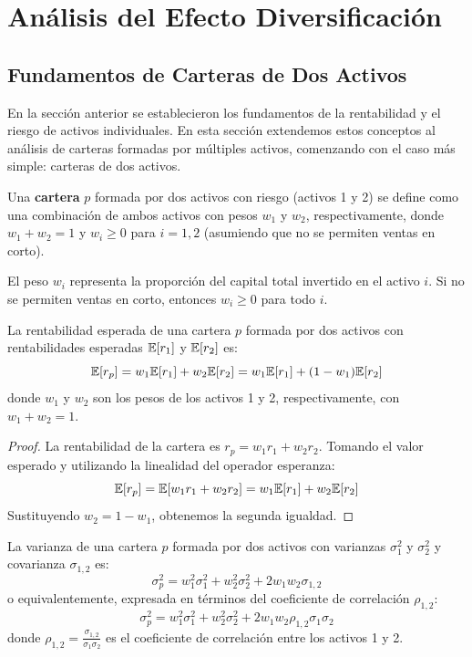 \section{Análisis del Efecto Diversificación}

\subsection{Fundamentos de Carteras de Dos Activos}

En la sección anterior se establecieron los fundamentos de la rentabilidad y el riesgo de activos individuales. En esta sección extendemos estos conceptos al análisis de carteras formadas por múltiples activos, comenzando con el caso más simple: carteras de dos activos.

\begin{definicion}
Una \textbf{cartera} $p$ formada por dos activos con riesgo (activos 1 y 2) se define como una combinación de ambos activos con pesos $w_1$ y $w_2$, respectivamente, donde $w_1 + w_2 = 1$ y $w_i \geq 0$ para $i = 1, 2$ (asumiendo que no se permiten ventas en corto).
\end{definicion}

El peso $w_i$ representa la proporción del capital total invertido en el activo $i$. Si no se permiten ventas en corto, entonces $w_i \geq 0$ para todo $i$.

\begin{teorema}
La rentabilidad esperada de una cartera $p$ formada por dos activos con rentabilidades esperadas $\mathbb{E}[r_1]$ y $\mathbb{E}[r_2]$ es:
\begin{equation}
\mathbb{E}[r_p] = w_1 \mathbb{E}[r_1] + w_2 \mathbb{E}[r_2] = w_1 \mathbb{E}[r_1] + (1 - w_1) \mathbb{E}[r_2]
\end{equation}
donde $w_1$ y $w_2$ son los pesos de los activos 1 y 2, respectivamente, con $w_1 + w_2 = 1$.
\end{teorema}

\begin{proof}
La rentabilidad de la cartera es $r_p = w_1 r_1 + w_2 r_2$. Tomando el valor esperado y utilizando la linealidad del operador esperanza:
$$\mathbb{E}[r_p] = \mathbb{E}[w_1 r_1 + w_2 r_2] = w_1 \mathbb{E}[r_1] + w_2 \mathbb{E}[r_2]$$
Sustituyendo $w_2 = 1 - w_1$, obtenemos la segunda igualdad.
\end{proof}

\begin{teorema}
La varianza de una cartera $p$ formada por dos activos con varianzas $\sigma_1^2$ y $\sigma_2^2$ y covarianza $\sigma_{1,2}$ es:
\begin{equation}
\sigma_p^2 = w_1^2 \sigma_1^2 + w_2^2 \sigma_2^2 + 2w_1 w_2 \sigma_{1,2}
\end{equation}
o equivalentemente, expresada en términos del coeficiente de correlación $\rho_{1,2}$:
\begin{equation}
\sigma_p^2 = w_1^2 \sigma_1^2 + w_2^2 \sigma_2^2 + 2w_1 w_2 \rho_{1,2} \sigma_1 \sigma_2
\end{equation}
donde $\rho_{1,2} = \frac{\sigma_{1,2}}{\sigma_1 \sigma_2}$ es el coeficiente de correlación entre los activos 1 y 2.
\end{teorema}

